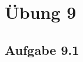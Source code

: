 \documentclass{standalone}
\begin{document}
\section{Übung 9}
\subsection{Aufgabe 9.1}
\end{document}
